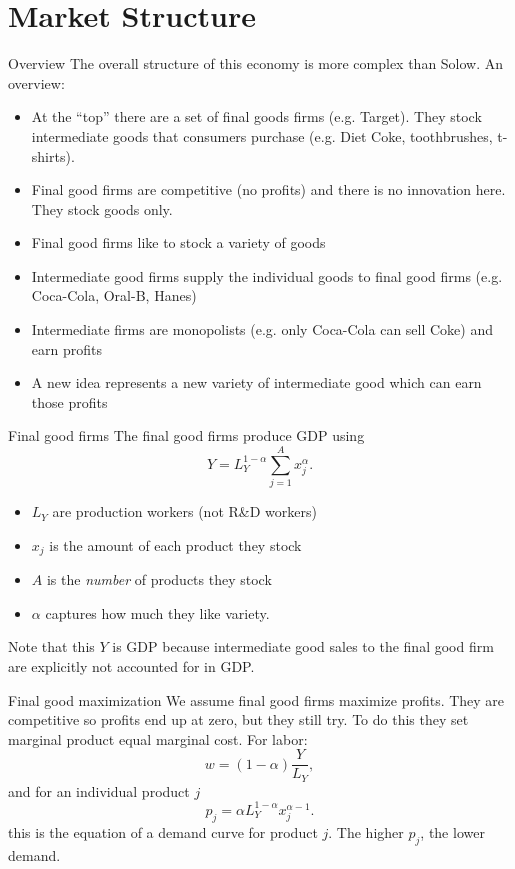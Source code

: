 \section{Market Structure}
\begin{frame}{Overview}
The overall structure of this economy is more complex than Solow. An overview:
\begin{itemize}
	\item At the ``top'' there are a set of final goods firms (e.g. Target). They stock intermediate goods that consumers purchase (e.g. Diet Coke, toothbrushes, t-shirts). 
	\item Final good firms are competitive (no profits) and there is no innovation here. They stock goods only. 
	\item Final good firms like to stock a variety of goods
	\item Intermediate good firms supply the individual goods to final good firms (e.g. Coca-Cola, Oral-B, Hanes)
	\item Intermediate firms are monopolists (e.g. only Coca-Cola can sell Coke) and earn profits
	\item A new idea represents a new variety of intermediate good which can earn those profits
\end{itemize}
\end{frame}

\begin{frame}{Final good firms}
The final good firms produce GDP using
\begin{equation}
	Y = L_{Y}^{1-\alpha} \sum_{j=1}^{A} x_{j}^{\alpha}. \nonumber
\end{equation}
\begin{itemize}
	\item $L_Y$ are production workers (not R\&D workers)
	\item $x_j$ is the amount of each product they stock
	\item $A$ is the \textit{number} of products they stock
	\item $\alpha$ captures how much they like variety.
\end{itemize}
Note that this $Y$ is GDP because intermediate good sales to the final good firm are explicitly not accounted for in GDP. 
\end{frame}

\begin{frame}{Final good maximization}
We assume final good firms maximize profits. They are competitive so profits end up at zero, but they still try. To do this they set marginal product equal marginal cost. For labor:
\begin{equation}
	w = (1-\alpha) \frac{Y}{L_Y}, \label{EQ_final_w}
\end{equation}
and for an individual product $j$
\begin{equation}
	p_j = \alpha L_Y^{1-\alpha} x_j^{\alpha-1}. \label{EQ_final_pj}
\end{equation}
this is the equation of a demand curve for product $j$. The higher $p_j$, the lower demand.
\end{frame}

